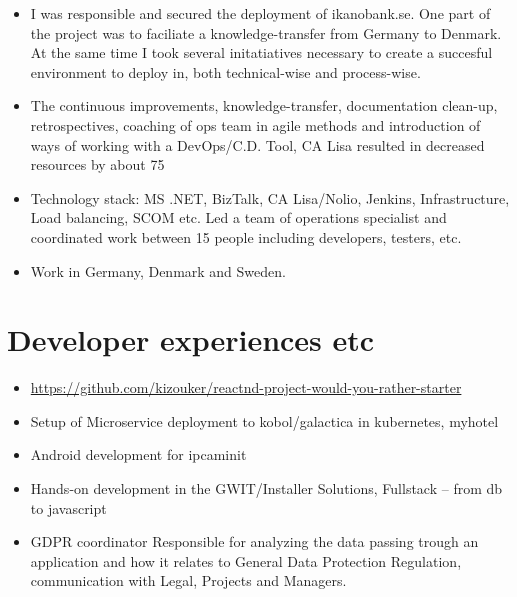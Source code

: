 \documentclass[11pt,a4paper,sans]{moderncv}        %
\begin{document}
\begin{itemize}
    \item I was responsible and secured the deployment of ikanobank.se. One part of the project was to faciliate a knowledge-transfer from Germany to Denmark. At the same time I took several initatiatives necessary to create a succesful environment to deploy in, both technical-wise and process-wise. 
    
    \item The continuous improvements, knowledge-transfer, documentation clean-up, retrospectives, coaching of ops team in agile methods and introduction of ways of working with a DevOps/C.D. Tool, CA Lisa resulted in decreased resources by about 75%
    
    \item Technology stack: MS .NET, BizTalk, CA Lisa/Nolio, Jenkins, Infrastructure, Load balancing, SCOM etc. Led a team of operations specialist and coordinated work between 15 people including developers, testers, etc. 
    
    \item Work in Germany, Denmark and Sweden. 
\end{itemize}

\section{Developer experiences etc}
\begin{itemize}
  \item  \url{https://github.com/kizouker/reactnd-project-would-you-rather-starter}
\end{itemize}

\begin{itemize}
    \item Setup of Microservice deployment to kobol/galactica in kubernetes, myhotel 
    \item Android development for ipcaminit   
    \item Hands-on development in the GWIT/Installer Solutions, Fullstack – from db to javascript 
    \item GDPR coordinator
    Responsible for analyzing the data passing trough an application and how it relates to General Data Protection Regulation, communication with Legal, Projects and Managers. 
\end{itemize}
\end{document}
